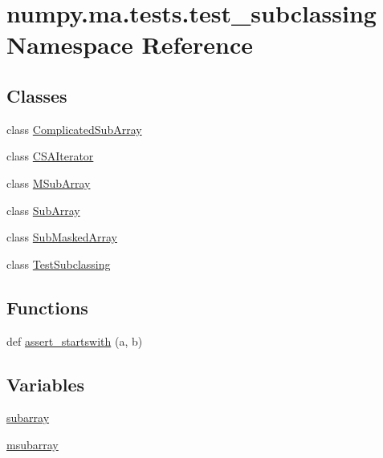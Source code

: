 \hypertarget{namespacenumpy_1_1ma_1_1tests_1_1test__subclassing}{}\section{numpy.\+ma.\+tests.\+test\+\_\+subclassing Namespace Reference}
\label{namespacenumpy_1_1ma_1_1tests_1_1test__subclassing}
\subsection*{Classes}
\begin{DoxyCompactItemize}
\item 
class \hyperlink{classnumpy_1_1ma_1_1tests_1_1test__subclassing_1_1ComplicatedSubArray}{Complicated\+Sub\+Array}
\item 
class \hyperlink{classnumpy_1_1ma_1_1tests_1_1test__subclassing_1_1CSAIterator}{C\+S\+A\+Iterator}
\item 
class \hyperlink{classnumpy_1_1ma_1_1tests_1_1test__subclassing_1_1MSubArray}{M\+Sub\+Array}
\item 
class \hyperlink{classnumpy_1_1ma_1_1tests_1_1test__subclassing_1_1SubArray}{Sub\+Array}
\item 
class \hyperlink{classnumpy_1_1ma_1_1tests_1_1test__subclassing_1_1SubMaskedArray}{Sub\+Masked\+Array}
\item 
class \hyperlink{classnumpy_1_1ma_1_1tests_1_1test__subclassing_1_1TestSubclassing}{Test\+Subclassing}
\end{DoxyCompactItemize}
\subsection*{Functions}
\begin{DoxyCompactItemize}
\item 
def \hyperlink{namespacenumpy_1_1ma_1_1tests_1_1test__subclassing_a562054d159df0a70f0e42bf54950768a}{assert\+\_\+startswith} (a, b)
\end{DoxyCompactItemize}
\subsection*{Variables}
\begin{DoxyCompactItemize}
\item 
\hyperlink{namespacenumpy_1_1ma_1_1tests_1_1test__subclassing_ab2855410e6af67899c824ee2a1308fea}{subarray}
\item 
\hyperlink{namespacenumpy_1_1ma_1_1tests_1_1test__subclassing_a81bd280679777d7e8868a9c4b9aeef2e}{msubarray}
\end{DoxyCompactItemize}


